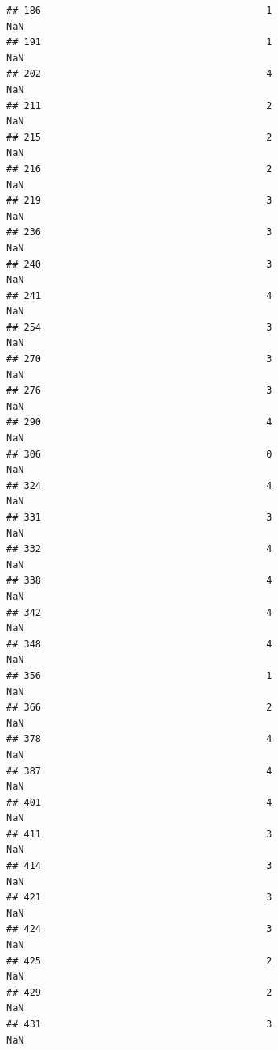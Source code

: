 \documentclass[
]{article}
\begin{document}
\begin{verbatim}
## 186                                       1                             NaN
## 191                                       1                             NaN
## 202                                       4                             NaN
## 211                                       2                             NaN
## 215                                       2                             NaN
## 216                                       2                             NaN
## 219                                       3                             NaN
## 236                                       3                             NaN
## 240                                       3                             NaN
## 241                                       4                             NaN
## 254                                       3                             NaN
## 270                                       3                             NaN
## 276                                       3                             NaN
## 290                                       4                             NaN
## 306                                       0                             NaN
## 324                                       4                             NaN
## 331                                       3                             NaN
## 332                                       4                             NaN
## 338                                       4                             NaN
## 342                                       4                             NaN
## 348                                       4                             NaN
## 356                                       1                             NaN
## 366                                       2                             NaN
## 378                                       4                             NaN
## 387                                       4                             NaN
## 401                                       4                             NaN
## 411                                       3                             NaN
## 414                                       3                             NaN
## 421                                       3                             NaN
## 424                                       3                             NaN
## 425                                       2                             NaN
## 429                                       2                             NaN
## 431                                       3                             NaN

\end{verbatim}
\end{document}
